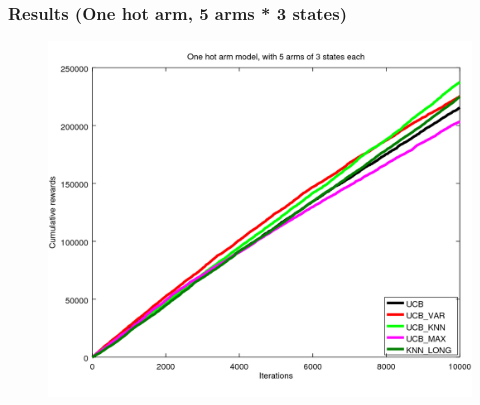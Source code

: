 \documentclass[french]{beamer}
\begin{document}
\begin{frame}
	\frametitle{Results (One hot arm, 5 arms * 3 states)}
	
	\begin{figure}[h]
		\begin{center}
			\vspace{-10pt}
			\includegraphics[width=1.05\textheight]{all_s_10000it.png}
			
			\vspace{-10pt}
		\end{center}
	\end{figure}
\end{frame}
\end{document}
